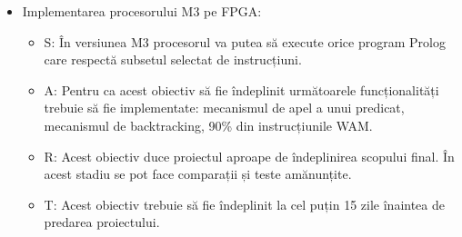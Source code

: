 \documentclass[12pt,a4paper,twoside]{report}
\begin{document}
\begin{itemize}
\begin{itemize}
		\item M: Obținerea unor executabilie testate și compatibile cu sistemele de operare din familia UNIX.
		\item A: Compilarea Prolog->WAM este efectuată de către GPLC reducând considerabil complexitatea acestui obiectiv.
		\item R: Datorită acestor programe, interacțiunea dintre FPWAM și utilizator va fi posibilă într-un mod natural și eficient.
		\item T: Funcționalitățile de baza trebuie să fie implementate în maxim 3 zile.
	\end{itemize}
	\item Implementarea procesorului M3 pe FPGA:
	\begin{itemize}
		\item S: În versiunea M3 procesorul va putea să execute orice program Prolog care respectă subsetul selectat de instrucțiuni.
		\item A: Pentru ca acest obiectiv să fie îndeplinit următoarele funcționalități trebuie să fie implementate: mecanismul de apel a unui predicat,  mecanismul de backtracking, 90\% din instrucțiunile WAM.
		\item R: Acest obiectiv duce proiectul aproape de îndeplinirea scopului final. În acest stadiu se pot face comparații și teste amănunțite.
		\item T: Acest obiectiv trebuie să fie îndeplinit la cel puțin 15 zile înaintea de predarea proiectului.
	\end{itemize}
\end{itemize}
	
	
%
%
	


\end{document}
